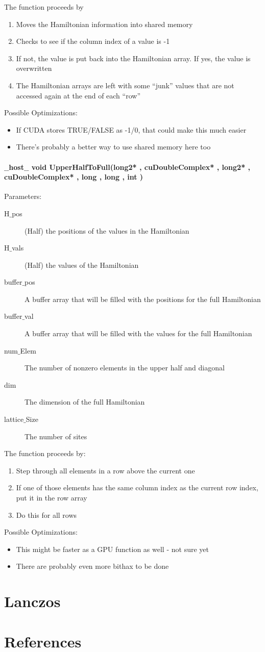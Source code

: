 \documentclass{article}
\begin{document}
The function proceeds by
\begin{enumerate}
\item{Moves the Hamiltonian information into shared memory}
\item{Checks to see if the column index of a value is -1}
\item{If not, the value is put back into the Hamiltonian array. If yes, the value is overwritten}
\item{The Hamiltonian arrays are left with some ``junk'' values that are not accessed again at the end of each ``row''}
\end{enumerate}

Possible Optimizations:
\begin{itemize}
\item{If CUDA stores TRUE/FALSE as -1/0, that could make this much easier}
\item{There's probably a better way to use shared memory here too}
\end{itemize}

\paragraph{$\_\_$host$\_\_$ void UpperHalfToFull(long2* , cuDoubleComplex* , long2* , cuDoubleComplex* , long , long , int )}  

Parameters:
\begin{description}
\item[H$\_$pos] (Half) the positions of the values in the Hamiltonian
\item[H$\_$vals] (Half) the values of the Hamiltonian
\item[buffer$\_$pos] A buffer array that will be filled with the positions for the full Hamiltonian
\item[buffer$\_$val] A buffer array that will be filled with the values for the full Hamiltonian
\item[num$\_$Elem] The number of nonzero elements in the upper half and diagonal
\item[dim] The dimension of the full Hamiltonian
\item[lattice$\_$Size] The number of sites
\end{description}

The function proceeds by:
\begin{enumerate}
\item{Step through all elements in a row above the current one}
\item{If one of those elements has the same column index as the current row index, put it in the row array}
\item{Do this for all rows}
\end{enumerate}

Possible Optimizations:
\begin{itemize}
\item{This might be faster as a GPU function as well - not sure yet}
\item{There are probably even more bithax to be done}
\end{itemize}



\section{Lanczos}

\section{References}
\end{document}
